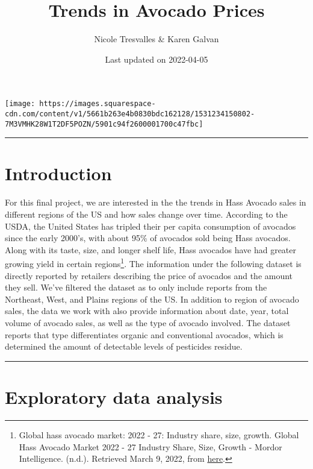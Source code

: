 \documentclass[
]{article}
\title{Trends in Avocado Prices}
\author{Nicole Tresvalles \& Karen Galvan}
\date{Last updated on 2022-04-05}
\begin{document}
\maketitle

{
\setcounter{tocdepth}{2}
\tableofcontents
}
\texttt{[image: https://images.squarespace-cdn.com/content/v1/5661b263e4b0830bdc162128/1531234150802-7M3VMHK28W1T2DF5POZN/5901c94f2600001700c47fbc]}

\begin{center}\rule{0.5\linewidth}{0.5pt}\end{center}

\hypertarget{introduction}{%
\section{Introduction}\label{introduction}}

For this final project, we are interested in the the trends in Hass
Avocado sales in different regions of the US and how sales change over
time. According to the USDA, the United States has tripled their per
capita consumption of avocados since the early 2000's, with about 95\%
of avocados sold being Hass avocados. Along with its taste, size, and
longer shelf life, Hass avocados have had greater growing yield in
certain regions\footnote{Global hass avocado market: 2022 - 27: Industry
  share, size, growth. Global Hass Avocado Market \textbar{} 2022 - 27
  \textbar{} Industry Share, Size, Growth - Mordor Intelligence. (n.d.).
  Retrieved March 9, 2022, from
  \href{https://www.mordorintelligence.com/industry-reports/global-hass-avocado-market\#:~:text=In\%20the\%20United\%20States\%2C\%20per,many\%20countries\%20across\%20the\%20globe}{here}.}.
The information under the following dataset is directly reported by
retailers describing the price of avocados and the amount they sell.
We've filtered the dataset as to only include reports from the
Northeast, West, and Plains regions of the US. In addition to region of
avocado sales, the data we work with also provide information about
date, year, total volume of avocado sales, as well as the type of
avocado involved. The dataset reports that type differentiates organic
and conventional avocados, which is determined the amount of detectable
levels of pesticides residue.

\begin{center}\rule{0.5\linewidth}{0.5pt}\end{center}

\hypertarget{exploratory-data-analysis}{%
\section{Exploratory data analysis}\label{exploratory-data-analysis}}
\end{document}
